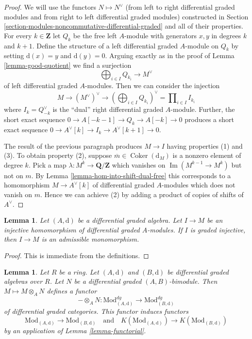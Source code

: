 \documentclass{stacks-project}
\theoremstyle{plain}
\newtheorem{lemma}[subsection]{Lemma}
\theoremstyle{definition}
\theoremstyle{remark}
\numberwithin{equation}{subsection}
\def\Im{\mathop{\mathrm{Im}}}
\def\Coker{\mathop{\mathrm{Coker}}}
\begin{document}
\begin{proof}
We will use the functors $N \mapsto N^\vee$ (from left to right
differential graded modules and from right to left differential
graded modules) constructed in
Section \ref{section-modules-noncommutative-differential-graded}
and all of their properties.
For every $k \in \mathbf{Z}$ let $Q_k$ be the free left $A$-module with
generators $x, y$ in degrees $k$ and $k + 1$. Define the structure of a
left differential graded $A$-module on $Q_k$ by setting $\text{d}(x) = y$
and $\text{d}(y) = 0$. Arguing exactly as in the proof of
Lemma \ref{lemma-good-quotient} we find a surjection
$$
\bigoplus\nolimits_{i \in I} Q_{k_i} \longrightarrow M^\vee
$$
of left differential graded $A$-modules. Then we can consider the injection
$$
M \to (M^\vee)^\vee \to (\bigoplus\nolimits_{i \in I} Q_{k_i})^\vee =
\prod\nolimits_{i \in I} I_{k_i}
$$
where $I_k = Q_{-k}^\vee$ is the ``dual'' right differential graded $A$-module.
Further, the short exact sequence $0 \to A[-k - 1] \to Q_k \to A[-k] \to 0$
produces a short exact sequence
$0 \to A^\vee[k] \to I_k \to A^\vee[k + 1] \to 0$.

\medskip\noindent
The result of the previous paragraph produces $M \to I$
having properties (1) and (3). To obtain property (2), suppose
$\overline{m} \in \Coker(\text{d}_M)$ is a nonzero element of
degree $k$. Pick a map $\lambda : M^k \to \mathbf{Q}/\mathbf{Z}$
which vanishes on $\Im(M^{k - 1} \to M^k)$ but not on $m$. By
Lemma \ref{lemma-hom-into-shift-dual-free}
this corresponds to a homomorphism $M \to A^\vee[k]$ of
differential graded $A$-modules which does not vanish on $m$.
Hence we can achieve (2) by adding
a product of copies of shifts of $A^\vee$.
\end{proof}

\begin{lemma}
\label{lemma-source-graded-injective}
Let $(A, \text{d})$ be a differential graded algebra.
Let $I \to M$ be an injective homomorphism of differential graded
$A$-modules. If $I$ is graded injective, then
$I \to M$ is an admissible monomorphism.
\end{lemma}

\begin{proof}
This is immediate from the definitions.
\end{proof}

\begin{lemma}
\label{lemma-tensor}
Let $R$ be a ring. Let $(A, \text{d})$ and $(B, \text{d})$
be differential graded algebras over $R$. Let $N$ be a
differential graded $(A, B)$-bimodule. Then
$M \mapsto M \otimes_A N$ defines a functor
$$
- \otimes_A N :
\text{Mod}^{dg}_{(A, \text{d})}
\longrightarrow
\text{Mod}^{dg}_{(B, \text{d})}
$$
of differential graded categories. This functor induces functors
$$
\text{Mod}_{(A, \text{d})} \to \text{Mod}_{(B, \text{d})}
\quad\text{and}\quad
K(\text{Mod}_{(A, \text{d})}) \to K(\text{Mod}_{(B, \text{d})})
$$
by an application of Lemma \ref{lemma-functorial}.
\end{lemma}
\end{document}

